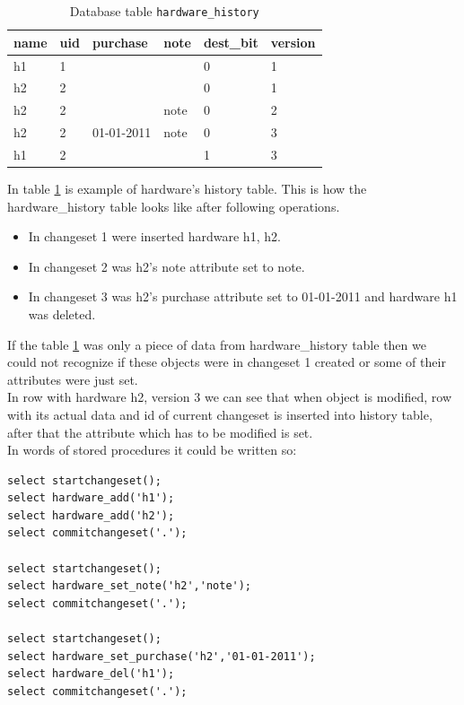 \documentclass[deska]{subfiles}
\begin{document}
\begin{longtable}{ l | l | l | l | l | l }
    \caption{Database table {\tt hardware\_history}}
    \label{tab:example-hardwarehist} \\
    name & uid & purchase & note & dest\_bit & version\\
    \hline
    \endhead
    h1 & 1 & & & 0 & 1 \\
    h2 & 2 & & & 0 & 1 \\
    h2 & 2 & & note & 0 & 2 \\
    h2 & 2 & 01-01-2011 & note & 0 & 3 \\
    h1 & 2 & & & 1 & 3 \\
    \hline
\end{longtable}

In table \ref{tab:example-hardwarehist} is example of hardware's history table. This is how the hardware\_history table looks like after following operations. 
\begin{itemize}
    \item In changeset 1 were inserted hardware h1, h2.
    \item In changeset 2 was h2's note attribute set to note.
    \item In changeset 3 was h2's purchase attribute set to 01-01-2011 and hardware h1 was deleted.
\end{itemize}


If the table \ref{tab:example-hardwarehist} was only a piece of data from hardware\_history table then we could not recognize if these objects were in changeset 1 created or some of their attributes were just set.\\
In row with hardware h2, version 3 we can see that when object is modified, row with its actual data and id of current changeset is inserted into history table, after that the attribute which has to be modified is set.\\
In words of stored procedures it could be written so:\\

\begin{verbatim}
select startchangeset();
select hardware_add('h1');
select hardware_add('h2');
select commitchangeset('.');

select startchangeset();
select hardware_set_note('h2','note');
select commitchangeset('.');

select startchangeset();
select hardware_set_purchase('h2','01-01-2011');
select hardware_del('h1');
select commitchangeset('.');
\end{verbatim}
\end{document}
